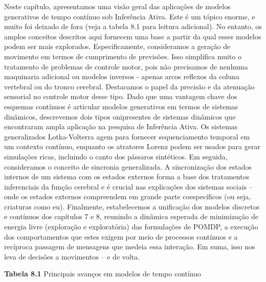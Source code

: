 \documentclass[
  12pt,
]{book}
\begin{document}
Neste capítulo, apresentamos uma visão geral das aplicações de modelos generativos de tempo contínuo sob Inferência Ativa. Este é um tópico enorme, e muito foi deixado de fora (veja a tabela 8.1 para leitura adicional). No entanto, os amplos conceitos descritos aqui fornecem uma base a partir da qual esses modelos podem ser mais explorados. Especificamente, consideramos a geração de movimento em termos de cumprimento de previsões. Isso simplifica muito o tratamento de problemas de controle motor, pois não precisamos de nenhuma maquinaria adicional ou modelos inversos - apenas arcos reflexos da coluna vertebral ou do tronco cerebral. Destacamos o papel da precisão e da atenuação sensorial no controle motor desse tipo. Dado que uma vantagem chave dos esquemas contínuos é articular modelos generativos em termos de sistemas dinâmicos, descrevemos dois tipos onipresentes de sistemas dinâmicos que encontraram ampla aplicação na pesquisa de Inferência Ativa. Os sistemas generalizados Lotka-Volterra agem para fornecer sequenciamento temporal em um contexto contínuo, enquanto os atratores Lorenz podem ser usados \hspace{0pt}\hspace{0pt}para gerar simulações ricas, incluindo o canto dos pássaros sintéticos. Em seguida, consideramos o conceito de sincronia generalizada. A sincronização dos estados internos de um sistema com os estados externos forma a base dos tratamentos inferenciais da função cerebral e é crucial nas explicações dos sistemas sociais -- onde os estados externos compreendem em grande parte coespecíficos (ou seja, criaturas como eu). Finalmente, estabelecemos a unificação dos modelos discretos e contínuos dos capítulos 7 e 8, reunindo a dinâmica esperada de minimização de energia livre (exploração e exploratória) das formulações de POMDP, a execução dos comportamentos que estes exigem por meio de processos contínuos e a recíproca passagem de mensagens que medeia essa interação. Em suma, isso nos leva de decisões a movimentos -- e de volta.

\textbf{Tabela 8.1} Principais avanços em modelos de tempo contínuo
\end{document}
